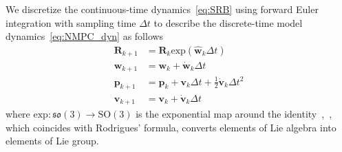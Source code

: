 We discretize the continuous-time dynamics~\eqref{eq:SRB} using forward Euler integration with sampling time $\Delta{t}$ to describe the discrete-time model dynamics~\eqref{eq:NMPC_dyn} as follows
\begin{subequations} \label{eq:NMPC_fwd_dyn}
	\begin{align}
	\label{eq:state_R}
	\mathbf{R}_{k+1} &= \mathbf{R}_{k} \mathrm{exp}(\widehat{\mathbf{w}}_{k} \Delta{t}) \\
	\label{eq:state_w}
	\mathbf{w}_{k+1} &= \mathbf{w}_{k} + \dot{\mathbf{w}}_{k}\Delta{t} \\
	\label{eq:state_p}
	\mathbf{p}_{k+1} &= \mathbf{p}_{k} + \mathbf{v}_{k} \Delta{t} + \frac{1}{2}\dot{\mathbf{v}}_{k}\Delta{t}^2 \\
	\label{eq:state_v}
	\mathbf{v}_{k+1} &= \mathbf{v}_{k} + \dot{\mathbf{v}}_{k}\Delta{t}
	\end{align}
\end{subequations}
where $\mathrm{exp}:\mathfrak{so}(3) \rightarrow \mathrm{SO}(3)$ is the exponential map around the identity~\cite{lynch2017modern},~\cite{chirikjian2011stochastic}, which coincides with Rodrigues' formula, converts elements of Lie algebra into elements of Lie group.

